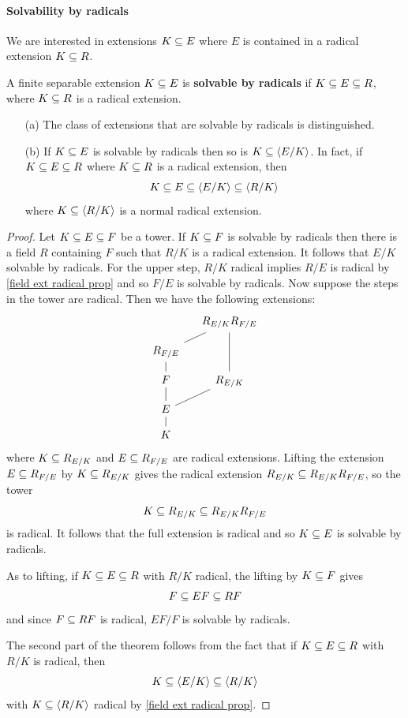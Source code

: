 \paragraph{Solvability by radicals}
We are interested in extensions $K\subseteq E$ where $E$ is contained in a radical extension $K\subseteq R$.
\begin{definition}
A finite separable extension $K\subseteq E$ is \textbf{solvable by radicals} if $K\subseteq E\subseteq R$, where $K\subseteq R$ is a radical extension.
\end{definition}
\begin{proposition}
\mbox{}
\begin{itemize}
\item[(a)] The class of extensions that are solvable by radicals is distinguished.
\item[(b)] If $K\subseteq E$ is solvable by radicals then so is $K\subseteq\langle E/K\rangle$. In fact, if $K\subseteq E\subseteq R$ where $K\subseteq R$ is a radical extension, then 
\[K\subseteq E\subseteq\langle E/K\rangle\subseteq\langle R/K\rangle\]
where $K\subseteq\langle R/K\rangle$ is a normal radical extension.
\end{itemize}
\end{proposition}
\begin{proof}
Let $K\subseteq E\subseteq F$ be a tower. If $K\subseteq F$ is solvable by radicals then there is a field $R$ containing $F$ such that $R/K$ is a  radical extension. It follows that $E/K$ solvable by radicals. For the upper step, $R/K$ radical implies $R/E$ is radical by \cref{field ext radical prop} and so $F/E$ is solvable by radicals. Now suppose the steps in the tower are radical. Then we have the following extensions:
\[\begin{tikzcd}[column sep=small,row sep=small]
&R_{E/K}R_{F/E}\\
R_{F/E}\ar[ru,no head]&\\
F\ar[u,no head]&R_{E/K}\ar[uu,no head]\\
E\ar[u,no head]\ar[ru,no head]&\\
K\ar[u,no head]
\end{tikzcd}\]
where $K\subseteq R_{E/K}$ and $E\subseteq R_{F/E}$ are radical extensions. Lifting the extension $E\subseteq R_{F/E}$ by $K\subseteq R_{E/K}$ gives the radical extension $R_{E/K}\subseteq R_{E/K}R_{F/E}$, so the tower
\[K\subseteq R_{E/K}\subseteq R_{E/K}R_{F/E}\]
is radical. It follows that the full extension is radical and so $K\subseteq E$ is solvable by radicals.\par
As to lifting, if $K\subseteq E\subseteq R$ with $R/K$ radical, the lifting by $K\subseteq F$ gives
\[F\subseteq EF\subseteq RF\]
and since $F\subseteq RF$ is radical, $EF/F$ is solvable by radicals.\par
The second part of the theorem follows from the fact that if $K\subseteq E\subseteq R$ with $R/K$ is radical, then
\[K\subseteq\langle E/K\rangle\subseteq\langle R/K\rangle\]
with $K\subseteq\langle R/K\rangle$ radical by \cref{field ext radical prop}.
\end{proof}

